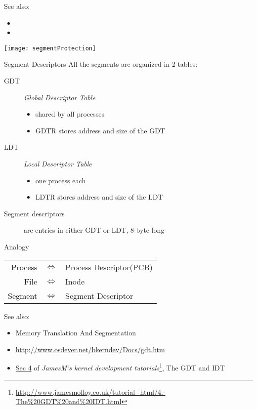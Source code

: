 See also:
\begin{itemize}
\item {}
\item {}
\end{itemize}


\begin{center}
  \texttt{[image: segmentProtection]}
\end{center}

\begin{frame}{Segment Descriptors}
    All the segments are organized in 2 tables:
    \begin{description}
    \item[GDT] \emph{Global Descriptor Table}
      \begin{itemize}
      \item shared by all processes
      \item GDTR stores address and size of the GDT
      \end{itemize}
    \item[LDT] \emph{Local Descriptor Table}
      \begin{itemize}
      \item one process each
      \item LDTR stores address and size of the LDT
      \end{itemize}
    \item[Segment descriptors] are entries in either GDT or LDT, 8-byte long
    \end{description}
      \begin{block}{Analogy}
        \begin{center}
          \begin{tabular}{rcl}
            Process&$\Longleftrightarrow$&Process Descriptor(PCB)\\
            File&$\Longleftrightarrow$&Inode\\
            Segment&$\Longleftrightarrow$&Segment Descriptor
          \end{tabular}
        \end{center}
      \end{block}
\end{frame}

See also:
\begin{itemize}
\item Memory Translation And Segmentation 
\item \url{http://www.osdever.net/bkerndev/Docs/gdt.htm}
\item \href{http://www.jamesmolloy.co.uk/tutorial\_html/4.-The\%20GDT\%20and\%20IDT.html}{Sec 4} of \emph{JamesM's kernel development
    tutorials}\footnote{\url{http://www.jamesmolloy.co.uk/tutorial_html/4.-The\%20GDT\%20and\%20IDT.html}},
  The GDT and IDT
\end{itemize}


